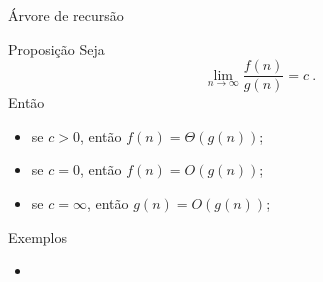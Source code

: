 \begin{frame}{Árvore de recursão}

    \begin{block}{Proposição}
        Seja
        \[ \lim_{n \to \infty} \frac{f(n)}{g(n)} = c \ . \]
        Então
            \begin{itemize}
                \item[(i)] se $c > 0$, então $f(n) = \Theta(g(n))$;
                \item[(ii)] se $c = 0$, então $f(n) = O(g(n))$; %
                \item[(iii)] se $c = \infty$, então $g(n) = O(g(n))$;  
            \end{itemize}
    \end{block}


    \begin{block}{Exemplos}
        \begin{itemize}
            \item[(i)] 
        \end{itemize}
    \end{block}

\end{frame}

